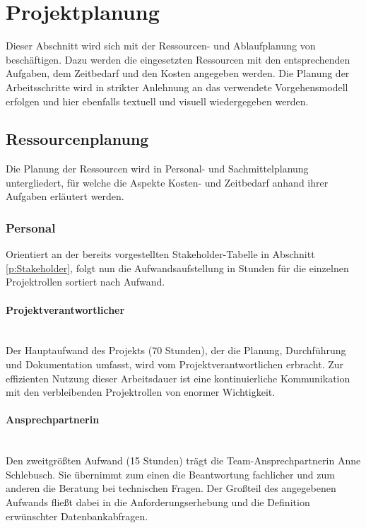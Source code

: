 \section{Projektplanung} 
\label{sec:Projektplanung}
Dieser Abschnitt wird sich mit der Ressourcen- und Ablaufplanung von \projektName beschäftigen. Dazu werden die eingesetzten Ressourcen mit den entsprechenden Aufgaben, dem Zeitbedarf und den Kosten angegeben werden. Die Planung der Arbeitsschritte wird in strikter Anlehnung an das verwendete Vorgehensmodell erfolgen und hier ebenfalls textuell und visuell wiedergegeben werden.

\subsection{Ressourcenplanung}
\label{sec:Ressourcenplanung}
Die Planung der Ressourcen wird in Personal- und Sachmittelplanung untergliedert, für welche die Aspekte Kosten- und Zeitbedarf anhand ihrer Aufgaben erläutert werden.

\subsubsection{Personal}
\label{sec:Personal}
Orientiert an der bereits vorgestellten Stakeholder-Tabelle in Abschnitt \ref{p:Stakeholder}, folgt nun die Aufwandsaufstellung in Stunden für die einzelnen Projektrollen sortiert nach Aufwand.

\paragraph{Projektverantwortlicher} ~\\
\label{p:Projektverantwortlicher}
Der Hauptaufwand des Projekts (70 Stunden), der \ua die Planung, Durchführung und Dokumentation umfasst, wird vom Projektverantwortlichen \autorName\xspace erbracht. Zur effizienten Nutzung dieser Arbeitsdauer ist eine kontinuierliche Kommunikation mit den verbleibenden Projektrollen von enormer Wichtigkeit.

\paragraph{Ansprechpartnerin} ~\\
\label{p:Ansprechpartnerin}
Den zweitgrößten Aufwand (15 Stunden) trägt die Team-Ansprechpartnerin Anne Schlebusch. Sie übernimmt zum einen die Beantwortung fachlicher und zum anderen die Beratung bei technischen Fragen. Der Großteil des angegebenen Aufwands fließt dabei in die Anforderungserhebung und die Definition erwünschter Datenbankabfragen.

